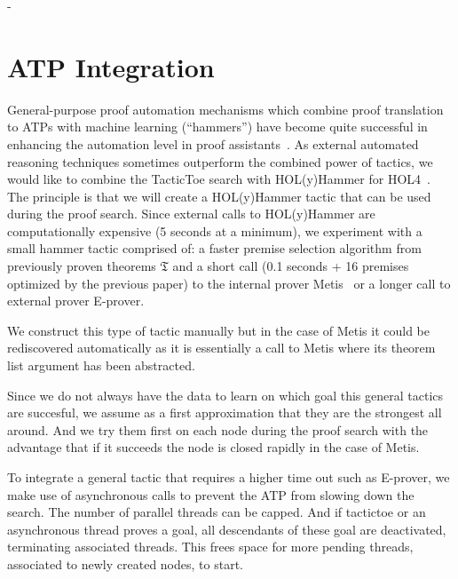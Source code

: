 \documentclass[runningheads,a4paper,draft]{svjour3}
\def\holfour{\textsf{HOL4}\xspace}
\def\eprover{\textsf{E-prover}\xspace}
\def\holyhammer{\textsf{HOL(y)Hammer}\xspace}
\def\metis{\textsf{Metis}\xspace}
\def\tactictoe{\textsf{TacticToe}\xspace}
\begin{document}
%
- 

\section{ATP Integration}

General-purpose proof automation mechanisms which combine proof translation to
ATPs with machine learning (``hammers'') have become quite successful in
enhancing the automation level in proof assistants~\cite{hammers4qed}.
As external automated reasoning techniques sometimes outperform the combined 
power of tactics, we would like to combine the \tactictoe search with 
\holyhammer for \holfour~\cite{tgck-cpp15}. The principle is that we will 
create a \holyhammer tactic that can be used during the proof search. Since 
external calls to \holyhammer are computationally expensive (5 seconds at a 
minimum), we  
experiment with a small hammer tactic comprised of: a faster premise 
selection algorithm from previously proven theorems $\mathfrak{T}$ and
a short call (0.1 seconds + 16 premises optimized by the previous paper) to the 
internal prover \metis~\cite{metis} or a
longer call to external prover \eprover. 

We construct this type of tactic manually but in the case of \metis it could be 
rediscovered automatically as it is essentially a call to \metis where its 
theorem list argument has been abstracted.

Since we do not always have the data to learn on which goal this general 
tactics are succesful, we assume as a first approximation that they are the 
strongest all around. And we try them first on each node during the proof 
search with the advantage that if it succeeds the node is closed rapidly in the 
case of \metis.

To integrate a general tactic that requires a higher time out such as \eprover, 
we make use of asynchronous calls to prevent the ATP 
from slowing down the search.  The number of parallel threads can be capped.
And if tactictoe or an asynchronous thread proves a goal, all descendants of 
these goal are deactivated, terminating associated threads. This frees space 
for more pending threads, associated to newly created nodes, to start.
\end{document}
